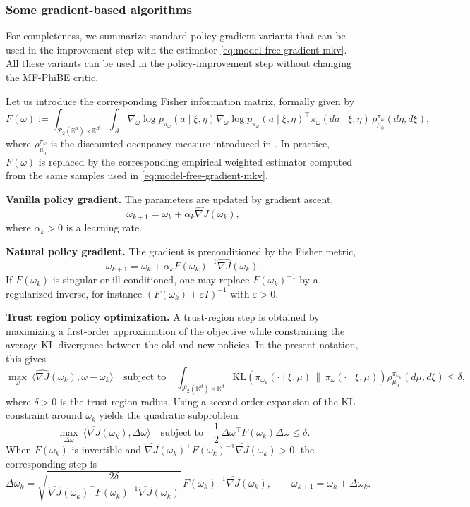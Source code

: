 \documentclass[a4paper, 10pt, english, reqno]{amsart}
\begin{document}
\subsubsection{Some gradient-based algorithms}\label{subsec:some_gb_algo}

For completeness, we summarize standard policy-gradient variants that can be used in the improvement step with the estimator \eqref{eq:model-free-gradient-mkv}. All these variants can be used in the policy-improvement step without changing the MF-PhiBE critic. 

Let us introduce the corresponding Fisher information matrix, formally given by
\[
  F(\omega)
  :=
  \int_{\mathcal P_2(\mathbb R^d)\times\mathbb R^d}
  \int_{\mathcal A}
  \nabla_\omega\log p_{\pi_\omega}(a\mid \xi,\eta)
  \nabla_\omega\log p_{\pi_\omega}(a\mid \xi,\eta)^\top
  \pi_\omega(da\mid \xi,\eta)\,
  \rho_{\mu_0}^{\pi_\omega}(d\eta,d\xi),
\]
where $\rho_{\mu_0}^{\pi_\omega}$ is the discounted occupancy measure introduced in
.   In practice, $F(\omega)$ is replaced by the corresponding empirical weighted estimator computed from the same samples used in \eqref{eq:model-free-gradient-mkv}.

\smallskip

\noindent\textbf{Vanilla policy gradient.}
The parameters are updated by gradient ascent,
\[
  \omega_{k+1}=\omega_k+\alpha_k \widehat{\nabla J}(\omega_k),
\]
where $\alpha_k>0$ is a learning rate.

\smallskip

\noindent\textbf{Natural policy gradient.}
The gradient is preconditioned by the Fisher metric,
\[
  \omega_{k+1}=\omega_k+\alpha_k F(\omega_k)^{-1}\widehat{\nabla J}(\omega_k).
\]
If $F(\omega_k)$ is singular or ill-conditioned, one may replace $F(\omega_k)^{-1}$ by a regularized inverse, for instance $(F(\omega_k)+\varepsilon I)^{-1}$ with $\varepsilon>0$.

\smallskip

\noindent\textbf{Trust region policy optimization.}
A trust-region step is obtained by maximizing a first-order approximation of the objective while constraining the average KL divergence between the old and new policies. In the present notation, this gives
\[
  \max_{\omega}\ \langle \widehat{\nabla J}(\omega_k),\omega-\omega_k\rangle
  \quad\text{subject to}\quad
  \int_{\mathcal P_2(\mathbb R^d)\times\mathbb R^d}
  \mathrm{KL}\!\left(
    \pi_{\omega_k}(\cdot\mid \xi,\mu)\,\|\,\pi_{\omega}(\cdot\mid \xi,\mu)
  \right)\rho_{\mu_0}^{\pi_{\omega_k}}(d\mu,d\xi)
  \le \delta,
\]
where $\delta>0$ is the trust-region radius. Using a second-order expansion of the KL constraint around $\omega_k$ yields the quadratic subproblem
\[
  \max_{\Delta\omega}\ \langle \widehat{\nabla J}(\omega_k),\Delta\omega\rangle
  \quad\text{subject to}\quad
  \frac12\,\Delta\omega^\top F(\omega_k)\Delta\omega\le\delta.
\]
When $F(\omega_k)$ is invertible and $\widehat{\nabla J}(\omega_k)^\top F(\omega_k)^{-1}\widehat{\nabla J}(\omega_k)>0$, the corresponding step is
\[
  \Delta\omega_k
  =
  \sqrt{\frac{2\delta}{\widehat{\nabla J}(\omega_k)^\top F(\omega_k)^{-1}\widehat{\nabla J}(\omega_k)}}\,
  F(\omega_k)^{-1}\widehat{\nabla J}(\omega_k),
  \qquad
  \omega_{k+1}=\omega_k+\Delta\omega_k.
\]
\end{document}
